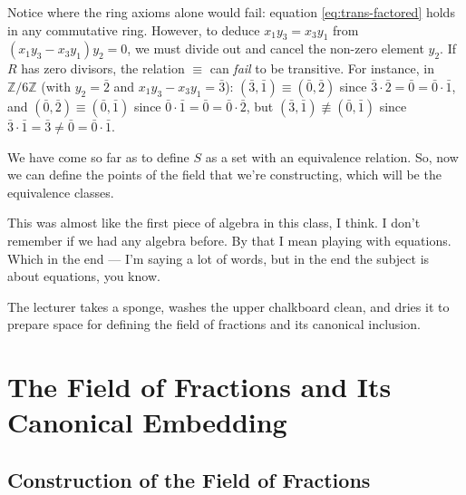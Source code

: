 \begin{content}
\begin{steps}
Notice where the ring axioms alone would fail: equation \eqref{eq:trans-factored} holds in any commutative ring. However, to deduce $x_1 y_3 = x_3 y_1$ from $(x_1 y_3 - x_3 y_1)y_2 = 0$, we must divide out and cancel the non-zero element $y_2$. If $R$ has zero divisors, the relation $\equiv$ can \emph{fail} to be transitive. For instance, in $\mathbb{Z}/6\mathbb{Z}$ (with $y_2 = \bar{2}$ and $x_1 y_3 - x_3 y_1 = \bar{3}$): $(\bar{3}, \bar{1}) \equiv (\bar{0}, \bar{2})$ since $\bar{3} \cdot \bar{2} = \bar{0} = \bar{0} \cdot \bar{1}$, and $(\bar{0}, \bar{2}) \equiv (\bar{0}, \bar{1})$ since $\bar{0} \cdot \bar{1} = \bar{0} = \bar{0} \cdot \bar{2}$, but $(\bar{3}, \bar{1}) \not\equiv (\bar{0}, \bar{1})$ since $\bar{3} \cdot \bar{1} = \bar{3} \neq \bar{0} = \bar{0} \cdot \bar{1}$.
\end{steps}
\end{content}

\begin{speech}[00:50:02 - 00:51:06]
We have come so far as to define $S$ as a set with an equivalence relation. So, now we can define the points of the field that we're constructing, which will be the equivalence classes.

This was almost like the first piece of algebra in this class, I think. I don't remember if we had any algebra before. By that I mean playing with equations. Which in the end --- I'm saying a lot of words, but in the end the subject is about equations, you know.
\end{speech}

\begin{note}
The lecturer takes a sponge, washes the upper chalkboard clean, and dries it to prepare space for defining the field of fractions and its canonical inclusion.
\end{note}

\section{The Field of Fractions and Its Canonical Embedding}

\subsection{Construction of the Field of Fractions}


